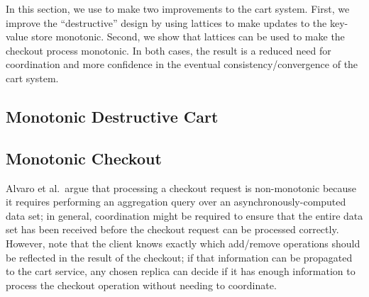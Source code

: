 In this section, we use \lang to make two improvements to the cart
system. First, we improve the ``destructive'' design by using lattices to make
updates to the key-value store monotonic. Second, we show that lattices can be
used to make the checkout process monotonic. In both cases, the result is a
reduced need for coordination and more confidence in the eventual
consistency/convergence of the cart system.

\subsection{Monotonic Destructive Cart}

\subsection{Monotonic Checkout}
Alvaro et al.\ argue that processing a checkout request is non-monotonic because
it requires performing an aggregation query over an asynchronously-computed data
set; in general, coordination might be required to ensure that the entire data
set has been received before the checkout request can be processed
correctly. However, note that the client knows exactly which add/remove
operations should be reflected in the result of the checkout; if that
information can be propagated to the cart service, any chosen replica can decide
if it has enough information to process the checkout operation without needing
to coordinate.
